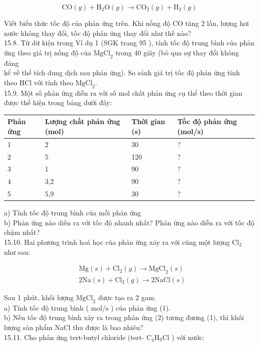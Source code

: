 \documentclass[10pt]{article}
\begin{document}
$$
\mathrm{CO}(g)+\mathrm{H}_{2} \mathrm{O}(g) \rightarrow \mathrm{CO}_{2}(g)+\mathrm{H}_{2}(g)
$$

Viết biểu thức tốc độ của phản ứng trên. Khi nồng độ CO tăng 2 lần, lượng hơi nước không thay đổi, tốc độ phản ứng thay đổi như thế nào?\\
15.8. Từ dữ kiện trong Ví dụ 1 (SGK trang 95 ), tính tốc độ trung bình của phản ứng theo giá trị nồng độ của $\mathrm{MgCl}_{2}$ trong 40 giây (bỏ qua sự thay đổi không đáng\\
kể về thể tích dung dịch sau phản ứng). So sánh giá trị tốc độ phản ứng tính theo HCl với tính theo $\mathrm{MgCl}_{2}$.\\
15.9. Một số phản ứng diễn ra với số mol chất phản ứng cụ thể theo thời gian được thể hiện trong bảng dưới đây:

\begin{center}
\begin{tabular}{|l|l|l|l|}
\hline
Phản ứng & Lượng chất phản ứng (mol) & Thời gian (s) & Tốc độ phản ứng (mol/s) \\
\hline
1 & 2 & 30 & ? \\
\hline
2 & 5 & 120 & ? \\
\hline
3 & 1 & 90 & ? \\
\hline
4 & 3,2 & 90 & ? \\
\hline
5 & 5,9 & 30 & ? \\
\hline
\end{tabular}
\end{center}

a) Tính tốc độ trung bình của mỗi phản ứng\\
b) Phản ứng nào diến ra với tốc độ nhanh nhất? Phản ứng nào diễn ra với tốc độ chậm nhất?\\
15.10. Hai phương trình hoá học của phản ứng xảy ra với cùng một lượng $\mathrm{Cl}_{2}$ như sau:


\begin{align*}
& \mathrm{Mg}(s)+\mathrm{Cl}_{2}(g) \rightarrow \mathrm{MgCl}_{2}(s)  \tag{1}\\
& 2 \mathrm{Na}(s)+\mathrm{Cl}_{2}(g) \rightarrow 2 \mathrm{NaCl}(s) \tag{2}
\end{align*}


Sau 1 phút, khối lượng $\mathrm{MgCl}_{2}$ được tạo ra 2 gam.\\
a) Tính tốc độ trung bình ( $\mathrm{mol} / \mathrm{s}$ ) của phản ứng (1).\\
b) Nếu tốc độ trung bình xảy ra trong phản ứng (2) tương đương (1), thì khối lượng sản phẩm NaCl thu được là bao nhiêu?\\
15.11. Cho phản ứng tert-butyl chloride (tert- $\mathrm{C}_{4} \mathrm{H}_{9} \mathrm{Cl}$ ) với nước:
\end{document}
